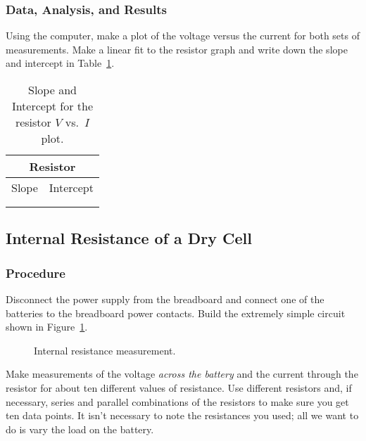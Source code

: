 \subsubsection{Data, Analysis, and Results}

Using the computer, make a plot of the voltage versus the current for both 
sets of measurements. Make a linear fit to the resistor graph and write
down the slope and intercept in Table~\ref{tab:DC:slopeinter}.

\begin{table}[htb]
\begin{center}
\begin{tabular}{|c|c|}
\hline
\multicolumn{2}{|c|}{Resistor} \\
\hline
Slope & Intercept \\
\hline
\hspace*{5cm} & \hspace*{5cm} \\
& \\
\hline
\end{tabular}
\end{center}
\caption{Slope and Intercept for the resistor $V$ vs.\ $I$ plot.}
\label{tab:DC:slopeinter}
\end{table}

\newpage

\newpage

\subsection{Internal Resistance of a Dry Cell} 
\subsubsection{Procedure}

Disconnect the power supply from the breadboard and connect one of the 
batteries to the breadboard power contacts. Build the extremely simple circuit
shown in Figure~\ref{fig:DC:procintresist}. 
\begin{figure}[htb]
\centerline{\epsfxsize=3cm }
\caption{Internal resistance measurement.}
\label{fig:DC:procintresist}
\end{figure}
Make measurements of the voltage {\it across the battery} and the current
through the resistor for about ten different values of resistance. Use
different resistors and, if necessary, series and parallel combinations
of the resistors to make sure you get ten data points. It isn't necessary to
note the resistances you used; all we want to do is vary the load on the 
battery. 



